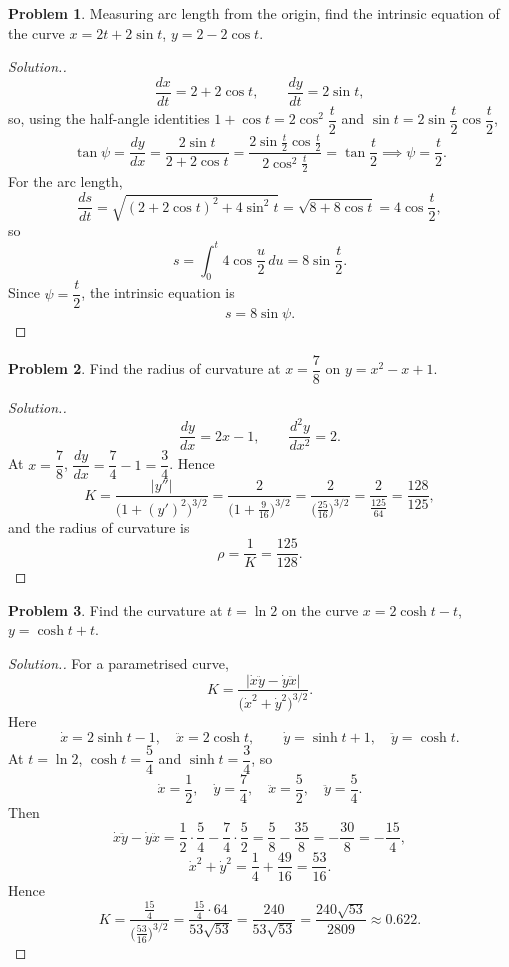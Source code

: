 \documentclass[11pt,a4paper]{article}
\theoremstyle{definition}
\newtheorem{problemx}{Problem}[subsection]
\newenvironment{problem}{\begin{problemx}}{\end{problemx}}
\newenvironment{solution}
  {\renewcommand{\qedsymbol}{}\begin{proof}[\textit{Solution}.]}
  {\end{proof}}
\begin{document}
\begin{problem}
Measuring arc length from the origin, find the intrinsic equation of the curve
$x = 2t + 2\sin t$, $y = 2 - 2\cos t$.
\end{problem}
\begin{solution}
$$\frac{dx}{dt} = 2 + 2\cos t, \qquad \frac{dy}{dt} = 2\sin t ,$$
so, using the half-angle identities $1+\cos t = 2\cos^2\dfrac t2$ and
$\sin t = 2\sin\dfrac t2\cos\dfrac t2$,
$$\tan\psi = \frac{dy}{dx} = \frac{2\sin t}{2+2\cos t}
= \frac{2\sin\frac t2\cos\frac t2}{2\cos^2\frac t2} = \tan\frac{t}{2}
\implies \psi = \frac{t}{2}.$$
For the arc length,
$$\frac{ds}{dt} = \sqrt{(2+2\cos t)^2 + 4\sin^2 t}
= \sqrt{8 + 8\cos t} = 4\cos\frac{t}{2},$$
so
$$s = \int_0^t 4\cos\frac{u}{2}\,du = 8\sin\frac{t}{2} .$$
Since $\psi = \dfrac t2$, the intrinsic equation is
$$s = 8\sin\psi .$$
\end{solution}

\begin{problem}
Find the radius of curvature at $x = \dfrac78$ on $y = x^2 - x + 1$.
\end{problem}
\begin{solution}
$$\frac{dy}{dx} = 2x-1, \qquad \frac{d^2y}{dx^2} = 2 .$$
At $x = \dfrac78$, $\dfrac{dy}{dx} = \dfrac74 - 1 = \dfrac34$. Hence
$$K = \frac{\left|y''\right|}{\big(1+(y')^2\big)^{3/2}}
= \frac{2}{\Big(1+\frac{9}{16}\Big)^{3/2}}
= \frac{2}{\Big(\frac{25}{16}\Big)^{3/2}}
= \frac{2}{\frac{125}{64}} = \frac{128}{125},$$
and the radius of curvature is
$$\rho = \frac{1}{K} = \frac{125}{128}.$$
\end{solution}

\begin{problem}
Find the curvature at $t = \ln 2$ on the curve
$x = 2\cosh t - t$, $y = \cosh t + t$.
\end{problem}
\begin{solution}
For a parametrised curve,
$$K = \frac{\left|\dot x\ddot y - \dot y\ddot x\right|}
{\big(\dot x^2 + \dot y^2\big)^{3/2}} .$$
Here
$$\dot x = 2\sinh t - 1,\quad \ddot x = 2\cosh t,\qquad
\dot y = \sinh t + 1,\quad \ddot y = \cosh t .$$
At $t = \ln 2$, $\cosh t = \dfrac54$ and $\sinh t = \dfrac34$, so
$$\dot x = \frac12,\quad \dot y = \frac74,\quad
\ddot x = \frac52,\quad \ddot y = \frac54 .$$
Then
$$\dot x\ddot y - \dot y\ddot x = \frac12\cdot\frac54 - \frac74\cdot\frac52
= \frac58 - \frac{35}{8} = -\frac{30}{8} = -\frac{15}{4},$$
$$\dot x^2 + \dot y^2 = \frac14 + \frac{49}{16} = \frac{53}{16}.$$
Hence
$$K = \frac{\frac{15}{4}}{\Big(\frac{53}{16}\Big)^{3/2}}
= \frac{\frac{15}{4}\cdot 64}{53\sqrt{53}}
= \frac{240}{53\sqrt{53}} = \frac{240\sqrt{53}}{2809}\approx 0.622 .$$
\end{solution}
\end{document}
